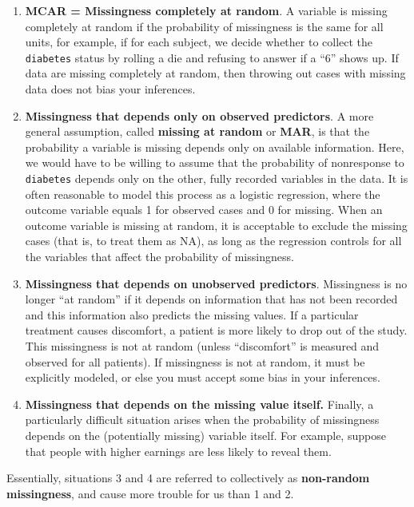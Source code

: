 \documentclass[]{book}
\providecommand{\tightlist}{%
  \setlength{\itemsep}{0pt}\setlength{\parskip}{0pt}}
\theoremstyle{definition}
\theoremstyle{definition}
\theoremstyle{definition}
\theoremstyle{remark}
\begin{document}
\begin{enumerate}
\def\labelenumi{\arabic{enumi}.}
\tightlist
\item
  \textbf{MCAR = Missingness completely at random}. A variable is
  missing completely at random if the probability of missingness is the
  same for all units, for example, if for each subject, we decide
  whether to collect the \texttt{diabetes} status by rolling a die and
  refusing to answer if a ``6'' shows up. If data are missing completely
  at random, then throwing out cases with missing data does not bias
  your inferences.
\item
  \textbf{Missingness that depends only on observed predictors}. A more
  general assumption, called \textbf{missing at random} or \textbf{MAR},
  is that the probability a variable is missing depends only on
  available information. Here, we would have to be willing to assume
  that the probability of nonresponse to \texttt{diabetes} depends only
  on the other, fully recorded variables in the data. It is often
  reasonable to model this process as a logistic regression, where the
  outcome variable equals 1 for observed cases and 0 for missing. When
  an outcome variable is missing at random, it is acceptable to exclude
  the missing cases (that is, to treat them as NA), as long as the
  regression controls for all the variables that affect the probability
  of missingness.
\item
  \textbf{Missingness that depends on unobserved predictors}.
  Missingness is no longer ``at random'' if it depends on information
  that has not been recorded and this information also predicts the
  missing values. If a particular treatment causes discomfort, a patient
  is more likely to drop out of the study. This missingness is not at
  random (unless ``discomfort'' is measured and observed for all
  patients). If missingness is not at random, it must be explicitly
  modeled, or else you must accept some bias in your inferences.
\item
  \textbf{Missingness that depends on the missing value itself.}
  Finally, a particularly difficult situation arises when the
  probability of missingness depends on the (potentially missing)
  variable itself. For example, suppose that people with higher earnings
  are less likely to reveal them.
\end{enumerate}

Essentially, situations 3 and 4 are referred to collectively as
\textbf{non-random missingness}, and cause more trouble for us than 1
and 2.
\end{document}
